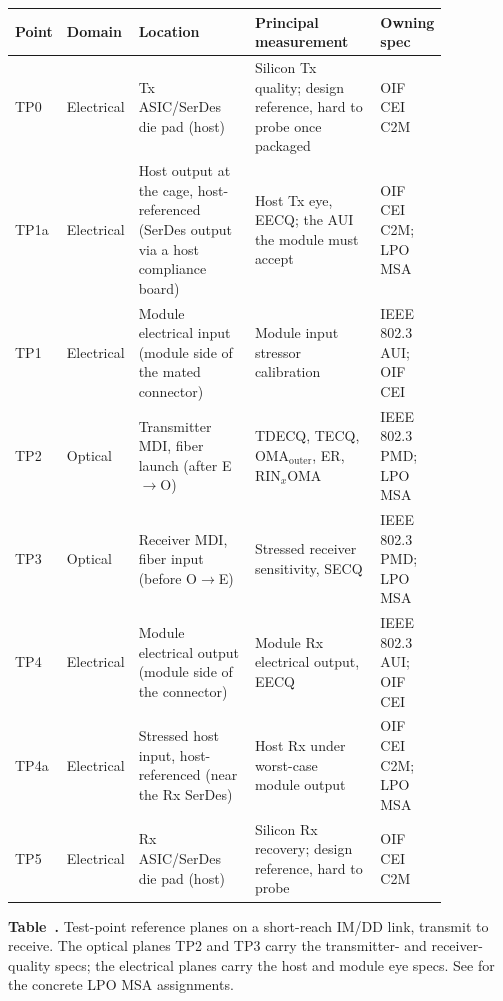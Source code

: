 \begin{table}[ht]
\label{tab:test-points}%
\centering
\setlength{\tabcolsep}{5pt}%
\footnotesize
\renewcommand{\arraystretch}{1.25}%
\begin{tabular}{@{}p{0.05\linewidth}p{0.075\linewidth}p{0.29\linewidth}p{0.30\linewidth}p{0.15\linewidth}@{}}
\toprule
Point & Domain & Location & Principal measurement & Owning spec \\
\midrule
TP0 & Electrical & Tx ASIC/SerDes die pad (host) & Silicon Tx quality; design reference, hard to probe once packaged & OIF CEI C2M \\
\addlinespace[1.5em]
TP1a & Electrical & Host output at the cage, host-referenced (SerDes output via a host compliance board) & Host Tx eye, EECQ; the AUI the module must accept & OIF CEI C2M; LPO MSA \\
\addlinespace[1.5em]
TP1 & Electrical & Module electrical input (module side of the mated connector) & Module input stressor calibration & IEEE 802.3 AUI; OIF CEI \\
\addlinespace[1.5em]
TP2 & Optical & Transmitter MDI, fiber launch (after E$\to$O) & TDECQ, TECQ, OMA$_{\mathrm{outer}}$, ER, RIN$_x$OMA & IEEE 802.3 PMD; LPO MSA \\
\addlinespace[1.5em]
TP3 & Optical & Receiver MDI, fiber input (before O$\to$E) & Stressed receiver sensitivity, SECQ & IEEE 802.3 PMD; LPO MSA \\
\addlinespace[1.5em]
TP4 & Electrical & Module electrical output (module side of the connector) & Module Rx electrical output, EECQ & IEEE 802.3 AUI; OIF CEI \\
\addlinespace[1.5em]
TP4a & Electrical & Stressed host input, host-referenced (near the Rx SerDes) & Host Rx under worst-case module output & OIF CEI C2M; LPO MSA \\
\addlinespace[1.5em]
TP5 & Electrical & Rx ASIC/SerDes die pad (host) & Silicon Rx recovery; design reference, hard to probe & OIF CEI C2M \\
\bottomrule
\end{tabular}
\par\medskip
{\raggedright\footnotesize\textbf{Table~\thetable.} Test-point reference planes on a
short-reach IM/DD link, transmit to receive. The optical planes TP2 and TP3 carry the
transmitter- and receiver-quality specs; the electrical planes carry the host and
module eye specs. See  for the concrete LPO MSA assignments.\par}
\end{table}

